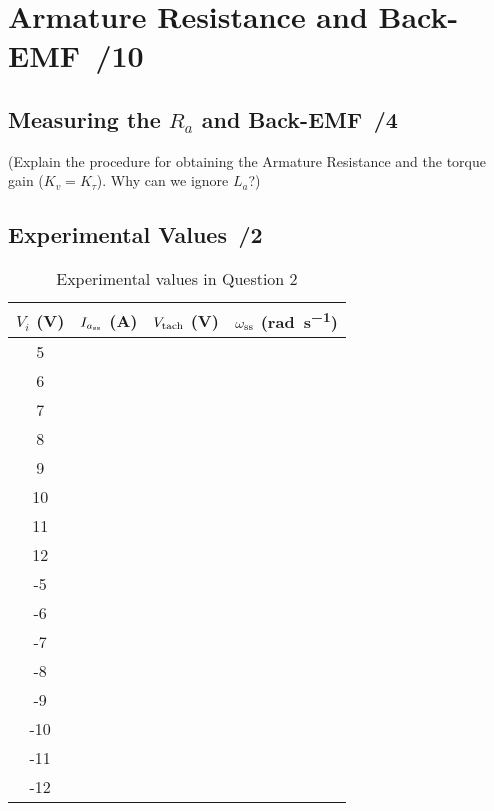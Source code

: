 \documentclass{article}
\newcommand{\score}{\hfill \underline{\hspace{0.65cm}}\,/} %
\begin{document}
\section{Armature Resistance and Back-EMF \score 10}
\subsection{Measuring the $R_a$ and Back-EMF \score 4}
(Explain the procedure for obtaining the Armature Resistance and the torque gain ($K_v = K_{\tau}$). Why can we ignore $L_a$?)

\subsection{Experimental Values \score 2}
\begin{table}[phtb] 
\begin{center}
\caption{Experimental values in Question 2}
\label{tbl:lab4_q2_1}
\begin{tabular}{c|r|r|r} \hline \hline
\cellcolor{lightgray} $V_i$ (\si{\volt}) & \cellcolor{lightgray} $I_{a_{\rm ss}}$ (\si{\ampere}) & \cellcolor{lightgray} $V_{\rm tach}$ (\si{\volt}) & \cellcolor{lightgray} $\omega_{\rm ss}$ (\si{\radian\per\second}) \\
\hline
5 &   &   &   \\ \hline
6 &   &   &   \\ \hline
7 &   &   &  \\ \hline
8 &   &   &  \\ \hline
9 &   &   &  \\ \hline
10  &   &   &  \\ \hline
11  &   &   &  \\ \hline
12  &   &   &  \\ \hline
-5  &   &   &  \\ \hline
-6  &  &  &  \\ \hline
-7  &  &  &   \\ \hline
-8  &  &  &   \\ \hline
-9  &  &  &   \\ \hline
-10 &  &  &   \\ \hline
-11 &  &  &   \\ \hline
-12 &  &  & \\ \hline
\end{tabular}
\end{center}
\end{table}
\end{document}

